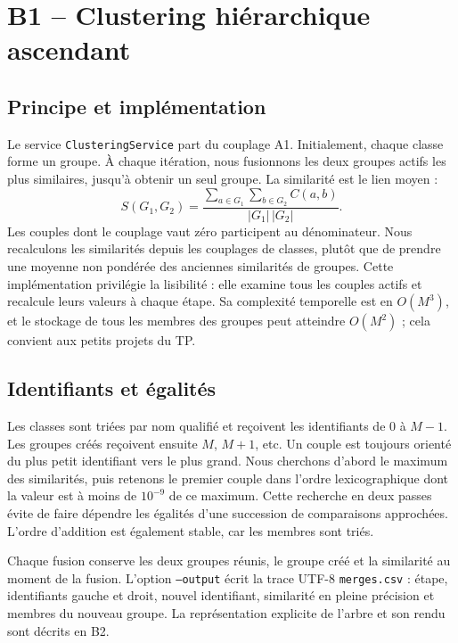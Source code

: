 \documentclass[11pt,a4paper]{article}
\begin{document}
\section{B1 -- Clustering hiérarchique ascendant}
\subsection{Principe et implémentation}
Le service \texttt{ClusteringService} part du couplage A1. Initialement, chaque
classe forme un groupe. À chaque itération, nous fusionnons les deux groupes
actifs les plus similaires, jusqu'à obtenir un seul groupe. La similarité est
le lien moyen :
\[
S(G_1,G_2)=\frac{\sum_{a\in G_1}\sum_{b\in G_2}C(a,b)}{|G_1|\,|G_2|}.
\]
Les couples dont le couplage vaut zéro participent au dénominateur. Nous
recalculons les similarités depuis les couplages de classes, plutôt que de
prendre une moyenne non pondérée des anciennes similarités de groupes.
Cette implémentation privilégie la lisibilité : elle examine tous les couples
actifs et recalcule leurs valeurs à chaque étape. Sa complexité temporelle est
en $O(M^3)$, et le stockage de tous les membres des groupes peut atteindre
$O(M^2)$ ; cela convient aux petits projets du TP.

\subsection{Identifiants et égalités}
Les classes sont triées par nom qualifié et reçoivent les identifiants de 0 à
$M-1$. Les groupes créés reçoivent ensuite $M$, $M+1$, etc. Un couple est toujours
orienté du plus petit identifiant vers le plus grand. Nous cherchons d'abord le
maximum des similarités, puis retenons le premier couple dans l'ordre
lexicographique dont la valeur est à moins de $10^{-9}$ de ce maximum.
Cette recherche en deux passes évite de faire dépendre les égalités d'une
succession de comparaisons approchées. L'ordre d'addition est également stable,
car les membres sont triés.

Chaque fusion conserve les deux groupes réunis, le groupe créé et la similarité
au moment de la fusion. L'option \texttt{--output} écrit la trace UTF-8
\texttt{merges.csv} : étape, identifiants gauche et droit, nouvel identifiant,
similarité en pleine précision et membres du nouveau groupe. La représentation
explicite de l'arbre et son rendu sont décrits en B2.
\end{document}
